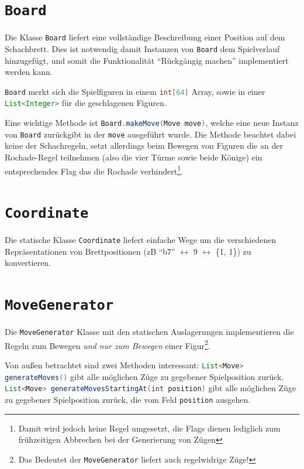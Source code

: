 \documentclass{scrreprt}
\newcommand{\lstinlinejava}[1]{\lstinline[language=java]{#1}}
\newcommand{\lstj}[1]{\lstinlinejava{#1}}
\begin{document}
\section{\lstj{Board}}

Die Klasse \lstinlinejava{Board} liefert eine vollständige Beschreibung einer Position auf dem Schachbrett. Dies ist notwendig damit Instanzen von \lstj{Board} dem Spielverlauf hinzugefügt, und somit die Funktionalität ``Rückgängig machen'' implementiert werden kann.

\lstinlinejava{Board} merkt sich die Spielfiguren in einem \lstinlinejava{int[64]} Array, sowie in einer \lstinlinejava{List<Integer>} für die geschlagenen Figuren.

Eine wichtige Methode ist \lstj{Board.makeMove(Move move)}, welche eine neue Instanz von \lstj{Board} zurückgibt in der \lstj{move} ausgeführt wurde. Die Methode beachtet dabei keine der Schachregeln, setzt allerdings beim Bewegen von Figuren die an der Rochade-Regel teilnehmen (also die vier Türme sowie beide Könige) ein entsprechendes Flag das die Rochade verhindert\footnote{Damit wird jedoch keine Regel umgesetzt, die Flags dienen lediglich zum frühzeitigen Abbrechen bei der Generierung von Zügen}.


\section{\lstj{Coordinate}}
Die statische Klasse \lstj{Coordinate} liefert einfache Wege um die verschiedenen Repräsentationen von Brettpositionen (zB ``b7'' $\leftrightarrow$ 9 $\leftrightarrow$ \{1, 1\}) zu konvertieren.


\section{\lstj{MoveGenerator}}
Die \lstj{MoveGenerator} Klasse mit den statischen Auslagerungen implementieren die Regeln zum Bewegen \emph{und nur zum Bewegen} einer Figur\footnote{Das Bedeutet der \lstj{MoveGenerator} liefert auch regelwidrige Züge!}.

Von außen betrachtet sind zwei Methoden interessant:
\newline
\lstj{List<Move> generateMoves()}
\newline
gibt alle möglichen Züge zu gegebener Spielposition zurück.
\newline
\lstj{List<Move> generateMovesStartingAt(int position)}
\newline
gibt alle möglichen Züge zu gegebener Spielposition zurück, die vom Feld \lstj{position} ausgehen.
\end{document}
